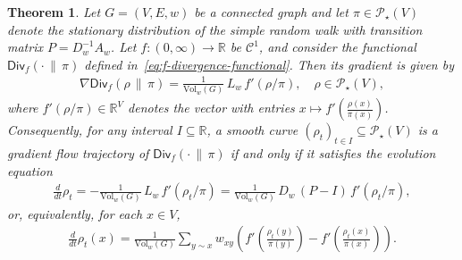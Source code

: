 \documentclass[11pt,a4paper]{article}
\newcommand{\Div}{\mathsf{Div}}
\newcommand{\Prob}{\mathscr{P}}
\newcommand{\Vol}{\mathrm{Vol}}
\newtheorem{theorem}{Theorem}[section]
\begin{document}
\begin{theorem}\label{thm:gradient-flow-fdiv}
    Let $G=(V,E,w)$ be a connected graph and let $\pi\in\Prob_\star(V)$ denote the stationary distribution of the simple random walk with transition matrix $P=D_w^{-1}A_w$. Let $f:(0,\infty)\to\mathbb{R}$ be $\mathcal{C}^1$, and consider the functional $\Div_f(\cdot\,\|\,\pi)$ defined in~\cref{eq:f-divergence-functional}. Then its gradient is given by
        \begin{align}\label{eq:fdiv-gradient}
            \nabla \Div_f(\rho\,\|\,\pi)
            = \frac{1}{\Vol_w(G)}\, L_w\, f'\!\left(\rho/\pi\right),\quad \rho\in\Prob_\star(V),
        \end{align}
    where $f'(\rho/\pi)\in\mathbb{R}^{V}$ denotes the vector with entries $x\mapsto f'\!\left(\frac{\rho(x)}{\pi(x)}\right)$. Consequently, for any interval $I\subseteq\mathbb{R}$, a smooth curve $(\rho_t)_{t\in I}\subseteq\Prob_\star(V)$ is a gradient flow trajectory of $\Div_f(\cdot\,\|\,\pi)$ if and only if it satisfies the evolution equation
        \begin{align}\label{eq:fdiv-gradient-flow}
            \frac{d}{dt}\rho_t
            = -\frac{1}{\Vol_w(G)}\, L_w\, f'\!\left(\rho_t/\pi\right)
            = \frac{1}{\Vol_w(G)}\, D_w\,(P-I)\, f'\!\left(\rho_t/\pi\right),
        \end{align}
    or, equivalently, for each $x\in V$,
        \begin{align}\label{eq:fdiv-gradient-flow-componentwise}
            \frac{d}{dt}\rho_t(x)
            = \frac{1}{\Vol_w(G)}\sum_{y\sim x} w_{xy}\left(
            f'\!\left(\frac{\rho_t(y)}{\pi(y)}\right) - f'\!\left(\frac{\rho_t(x)}{\pi(x)}\right)\right).
        \end{align}
\end{theorem}
\end{document}
